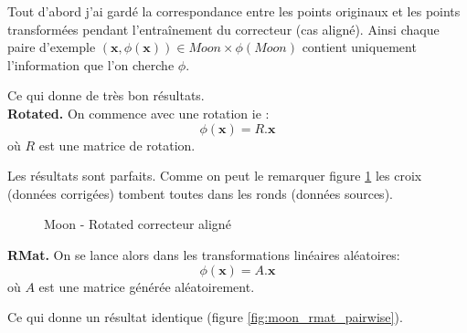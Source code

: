 
Tout d'abord j'ai gardé la correspondance entre les points originaux et
les points transformées pendant l'entraînement du correcteur (cas aligné).
Ainsi chaque paire d'exemple $(\pmb{x}, \phi(\pmb{x})) \in Moon\times \phi(Moon)$
contient uniquement l'information que l'on cherche $\phi$.

Ce qui donne de très bon résultats.\\


{\Large\textbf{Rotated.}} On commence avec une rotation ie :
$$ \phi(\pmb{x}) = R.\pmb{x}$$
où $R$ est une matrice de rotation.

Les résultats sont parfaits. Comme on peut le remarquer figure 
\ref{fig:moon_rotated_pairwise} les croix (données corrigées) tombent toutes
dans les ronds (données sources).

\begin{figure}[H] %
\centering
{}
\hfill
{}
\caption{Moon - Rotated correcteur aligné}
\label{fig:moon_rotated_pairwise}
\end{figure}


{\Large\textbf{RMat.}} On se lance alors dans les transformations linéaires aléatoires:
$$ \phi(\pmb{x}) = A.\pmb{x}$$
où $A$ est une matrice générée aléatoirement.

Ce qui donne un résultat identique (figure \ref{fig:moon_rmat_pairwise}).


